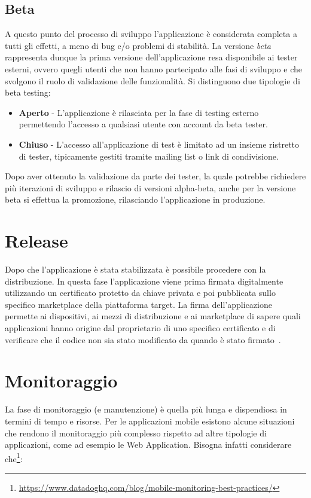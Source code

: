 \subsection{Beta}
A questo punto del processo di sviluppo l'applicazione è considerata completa a tutti gli effetti,
a meno di bug e/o problemi di stabilità. 
La versione \textit{beta} rappresenta dunque la prima versione dell'applicazione resa disponibile ai tester esterni, 
ovvero quegli utenti che non hanno partecipato alle fasi di sviluppo e che svolgono il ruolo di validazione delle funzionalità. 
Si distinguono due tipologie di beta testing:

\begin{itemize}
    \item \textbf{Aperto} - L'applicazione è rilasciata per la fase di testing esterno permettendo l'accesso a qualsiasi utente con account da beta tester.
    
    \item \textbf{Chiuso} - L'accesso all'applicazione di test è limitato ad un insieme ristretto di tester, tipicamente gestiti tramite mailing list o link di condivisione.
\end{itemize}

Dopo aver ottenuto la validazione da parte dei tester, 
la quale potrebbe richiedere più iterazioni di sviluppo e rilascio di versioni alpha-beta,
anche per la versione beta si effettua la promozione,
rilasciando l'applicazione in produzione.

\section{Release}
Dopo che l'applicazione è stata stabilizzata è possibile procedere con la distribuzione.
In questa fase l'applicazione viene prima firmata digitalmente utilizzando un certificato protetto da chiave privata e poi pubblicata sullo specifico marketplace della piattaforma target. 
La firma dell'applicazione permette ai dispositivi, 
ai mezzi di distribuzione e ai marketplace di sapere quali applicazioni hanno origine dal proprietario di uno specifico certificato e di verificare che il codice non sia stato modificato da quando è stato firmato~\cite{mednieks2011programming}.

\section{Monitoraggio}
La fase di monitoraggio (e manutenzione) è quella più lunga e dispendiosa in termini di tempo e risorse. 
Per le applicazioni mobile esistono alcune situazioni che rendono il monitoraggio più complesso rispetto ad altre tipologie di applicazioni, 
come ad esempio le Web Application. 
Bisogna infatti considerare che\footnote{\href{https://www.datadoghq.com/blog/mobile-monitoring-best-practices/}{https://www.datadoghq.com/blog/mobile-monitoring-best-practices/}}:


